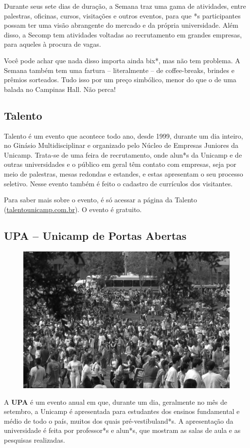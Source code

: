 Durante seus sete dias de duração, a Semana traz uma gama de atividades, entre
palestras, oficinas, cursos, visitações e outros eventos, para que *s
participantes possam ter uma visão abrangente do mercado e da própria
universidade. Além disso, a Secomp tem atividades voltadas ao recrutamento em
grandes empresas, para aqueles à procura de vagas.

Você pode achar que nada disso importa ainda bix*, mas não tem problema.  A
Semana também tem uma fartura -- literalmente -- de coffee-breaks, brindes e
prêmios sorteados. Tudo isso por um preço simbólico, menor do que o de uma
balada no Campinas Hall. Não perca!

\subsection{Talento}

Talento é um evento que acontece todo ano, desde 1999, durante um dia inteiro,
no Ginásio Multidisciplinar e organizado pelo Núcleo de Empresas Juniores da
Unicamp. Trata-se de uma feira de recrutamento, onde alun*s da Unicamp e de
outras universidades e o público em geral têm contato com empresas, seja por
meio de palestras, mesas redondas e estandes, e estas apresentam o seu processo
seletivo. Nesse evento também é feito o cadastro de currículos dos visitantes.

Para saber mais sobre o evento, é só acessar a página da Talento
(\url{talentounicamp.com.br}). O evento é gratuito.

\subsection{UPA -- Unicamp de Portas Abertas}

\begin{figure}[h!]
    \centering
    \includegraphics[width=.45\textwidth]{img/alem_da_graduacao/bateria_upa.jpg}
\end{figure}

A \textbf{UPA} é um evento anual em que, durante um dia, geralmente no mês de
setembro, a Unicamp é apresentada para estudantes dos ensinos fundamental e
médio de todo o país, muitos dos quais pré-vestibuland*s. A apresentação da
universidade é feita por professor*s e alun*s, que mostram as salas de aula e as
pesquisas realizadas.

